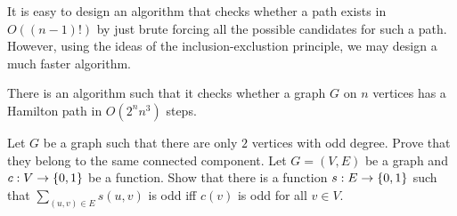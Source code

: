 It is easy to design an algorithm that checks whether a path exists in
$O((n - 1)!)$ by just brute forcing all the possible candidates for such a path.
However, using the ideas of the inclusion-exclustion principle, we may design
a much faster algorithm.
\begin{theorem}
  There is an algorithm such that it checks whether a graph $G$ on $n$ vertices
  has a Hamilton path in $O(2^n n^3)$ steps.
\end{theorem}


\begin{chapterendexercises}
  \exercise[recommended] Let $G$ be a graph such that there are only $2$
    vertices with odd degree. Prove that they belong to the same connected
    component.
  \exercise Let $G = (V, E)$ be a graph and $c : V \to \set{0, 1}$ be a
    function. Show that there is a function $s : E \to \set{0, 1}$
    such that $\sum_{(u, v) \in E} s(u, v)$ is odd iff $c(v)$ is odd
    for all $v \in V$.
\end{chapterendexercises}
